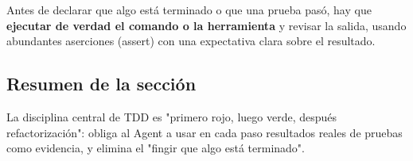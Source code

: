 Antes de declarar que algo está terminado o que una prueba pasó, hay que \textbf{ejecutar de verdad el comando o la herramienta} y revisar la salida, usando abundantes aserciones (assert) con una expectativa clara sobre el resultado.

\subsection{Resumen de la sección}

La disciplina central de TDD es "primero rojo, luego verde, después refactorización": obliga al Agent a usar en cada paso resultados reales de pruebas como evidencia, y elimina el "fingir que algo está terminado".

